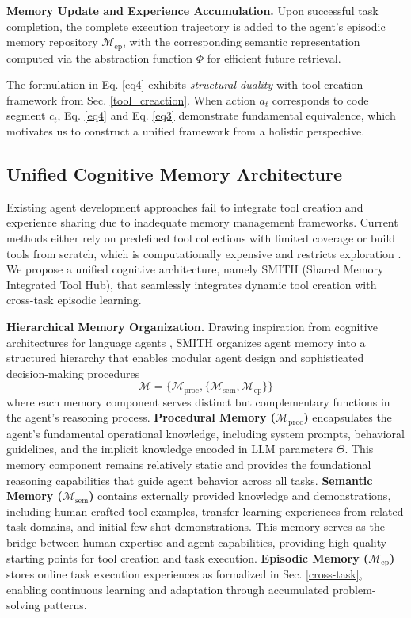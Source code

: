 \documentclass{article} %
\begin{document}
\textbf{Memory Update and Experience Accumulation.} Upon successful task completion, the complete execution trajectory is added to the agent's episodic memory repository $\mathcal{M}_{\text{ep}}$, with the corresponding semantic representation computed via the abstraction function $\Phi$ for efficient future retrieval.

The formulation in Eq. \ref{eq4} exhibits \textit{structural duality} with tool creation framework from Sec. \ref{tool_creaction}. When action $a_t$ corresponds to code segment $c_t$, Eq. \ref{eq4} and Eq. \ref{eq3} demonstrate fundamental equivalence, which motivates us to construct a unified framework from a holistic perspective.

\subsection{Unified Cognitive Memory Architecture}
\label{framework}

Existing agent development approaches fail to integrate tool creation and experience sharing due to inadequate memory management frameworks. Current methods either rely on predefined tool collections with limited coverage or build tools from scratch, which is computationally expensive and restricts exploration \citep{qiu2025alita}. We propose a unified cognitive architecture, namely SMITH (Shared Memory Integrated Tool Hub), that seamlessly integrates dynamic tool creation with cross-task episodic learning.

\textbf{Hierarchical Memory Organization.} Drawing inspiration from cognitive architectures for language agents \citep{sumers2023cognitive}, SMITH organizes agent memory into a structured hierarchy that enables modular agent design and sophisticated decision-making procedures
\begin{equation}
\mathcal{M} = \{ \mathcal{M}_{\text{proc}}, \{\mathcal{M}_{\text{sem}}, \mathcal{M}_{\text{ep}}\} \}
\end{equation}
where each memory component serves distinct but complementary functions in the agent's reasoning process. \textbf{Procedural Memory ($\mathcal{M}_{\text{proc}}$)} encapsulates the agent's fundamental operational knowledge, including system prompts, behavioral guidelines, and the implicit knowledge encoded in LLM parameters $\Theta$. This memory component remains relatively static and provides the foundational reasoning capabilities that guide agent behavior across all tasks. \textbf{Semantic Memory ($\mathcal{M}_{\text{sem}}$)} contains externally provided knowledge and demonstrations, including human-crafted tool examples, transfer learning experiences from related task domains, and initial few-shot demonstrations. This memory serves as the bridge between human expertise and agent capabilities, providing high-quality starting points for tool creation and task execution. \textbf{Episodic Memory ($\mathcal{M}_{\text{ep}}$)} stores online task execution experiences as formalized in Sec. \ref{cross-task}, enabling continuous learning and adaptation through accumulated problem-solving patterns.
\end{document}
